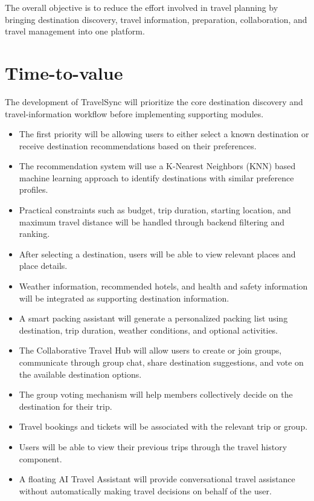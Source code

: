 \documentclass[11pt,a4paper]{article}
\begin{document}
The overall objective is to reduce the effort involved in travel planning by bringing destination discovery, travel information, preparation, collaboration, and travel management into one platform.



\section{Time-to-value}

The development of TravelSync will prioritize the core destination discovery and travel-information workflow before implementing supporting modules.

\begin{itemize}

\item The first priority will be allowing users to either select a known destination or receive destination recommendations based on their preferences.

\item The recommendation system will use a K-Nearest Neighbors (KNN) based machine learning approach to identify destinations with similar preference profiles.

\item Practical constraints such as budget, trip duration, starting location, and maximum travel distance will be handled through backend filtering and ranking.

\item After selecting a destination, users will be able to view relevant places and place details.

\item Weather information, recommended hotels, and health and safety information will be integrated as supporting destination information.

\item A smart packing assistant will generate a personalized packing list using destination, trip duration, weather conditions, and optional activities.

\item The Collaborative Travel Hub will allow users to create or join groups, communicate through group chat, share destination suggestions, and vote on the available destination options.

\item The group voting mechanism will help members collectively decide on the destination for their trip.

\item Travel bookings and tickets will be associated with the relevant trip or group.

\item Users will be able to view their previous trips through the travel history component.

\item A floating AI Travel Assistant will provide conversational travel assistance without automatically making travel decisions on behalf of the user.

\end{itemize}
\end{document}
